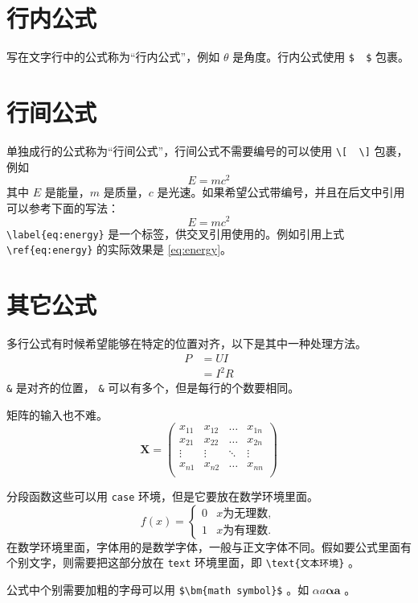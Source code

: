 \section{行内公式}
写在文字行中的公式称为“行内公式”，例如 $ \theta $ 是角度。行内公式使用 \verb|$  $| 包裹。

\section{行间公式}
单独成行的公式称为“行间公式”，行间公式不需要编号的可以使用 \verb|\[  \]| 包裹，例如
\[
E=mc^2
\]
其中 $E$ 是能量，$m$ 是质量，$c$ 是光速。如果希望公式带编号，并且在后文中引用可以参考下面的写法：
\begin{equation}\label{eq:energy}
E=mc^2
\end{equation}
\verb|\label{eq:energy}| 是一个标签，供交叉引用使用的。例如引用上式 \verb|\ref{eq:energy}| 的实际效果是 \ref{eq:energy}。

\section{其它公式}
多行公式有时候希望能够在特定的位置对齐，以下是其中一种处理方法。
\begin{align}
P & = UI \\
& = I^2R
\end{align}
\verb|&| 是对齐的位置， \verb|&| 可以有多个，但是每行的个数要相同。

矩阵的输入也不难。
\[
\mathbf{X} = \left(
    \begin{array}{cccc}
    x_{11} & x_{12} & \ldots & x_{1n}\\
    x_{21} & x_{22} & \ldots & x_{2n}\\
    \vdots & \vdots & \ddots & \vdots\\
    x_{n1} & x_{n2} & \ldots & x_{nn}\\
    \end{array} \right)
\]

分段函数这些可以用 \verb|case| 环境，但是它要放在数学环境里面。
\[
f(x) =
    \begin{cases}
        0 &  x \text{为无理数} ,\\
        1 &  x \text{为有理数} .
    \end{cases}
\]
在数学环境里面，字体用的是数学字体，一般与正文字体不同。假如要公式里面有个别文字，则需要把这部分放在 \verb|text| 环境里面，即 \verb|\text{文本环境}| 。

公式中个别需要加粗的字母可以用 \verb|$\bm{math symbol}$| 。如 $ \alpha a\bm{\alpha a} $ 。


